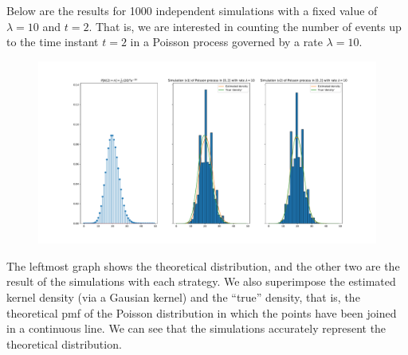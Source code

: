 Below are the results for 1000 independent simulations with a fixed value of $\lambda = 10$ and $t=2$. That is, we are interested in counting the number of events up to the time instant $t=2$ in a Poisson process governed by a rate $\lambda=10$.

\begin{figure}[h!]
  \centering
  \includegraphics[width=\textwidth]{img/ex1.pdf}
\end{figure}

The leftmost graph shows the theoretical distribution, and the other two are the result of the simulations with each strategy. We also superimpose the estimated kernel density (via a Gausian kernel) and the ``true'' density, that is, the theoretical pmf of the Poisson distribution in which the points have been joined in a continuous line. We can see that the simulations accurately represent the theoretical distribution.
